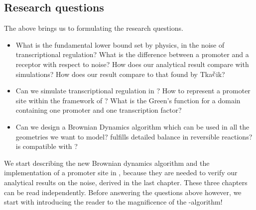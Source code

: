 \subsection{Research questions}
The above brings us to formulating the research questions.
\begin{itemize}
 \item What is the fundamental lower bound set by physics, in the noise of transcriptional regulation?
 \subitem What is the difference between a promoter and a receptor with respect to noise?
 \subitem How does our analytical result compare with simulations? 
 \subitem How does our result compare to that found by Tka$\check{\rm c}$ik?

 \item Can we simulate transcriptional regulation in \GFRD ?
 \subitem How to represent a promoter site within the framework of \GFRD?
 \subitem What is the Green's function for a domain containing one promoter and one transcription factor?
 
 \item Can we design a Brownian Dynamics algorithm which
 \subitem can be used in all the geometries we want to model?
 \subitem fulfills detailed balance in reversible reactions?
 \subitem is compatible with \GFRD ?
\end{itemize}
We start describing the new Brownian dynamics algorithm and the implementation of a promoter site in \GFRD, because they are needed to verify our analytical results on the noise, derived in the last chapter. These three chapters can be read independently. Before answering the questions above however, we start with introducing the reader to the magnificence of the \GFRD -algorithm!










